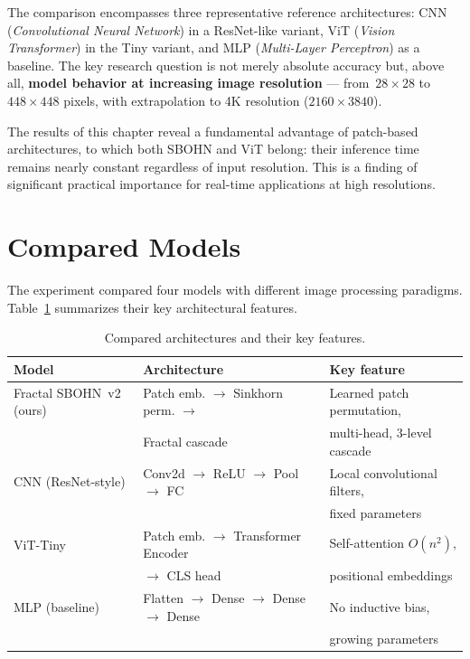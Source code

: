 \documentclass[11pt,a4paper]{report}
\begin{document}
The comparison encompasses three representative reference architectures: CNN (\emph{Convolutional Neural Network}) in a ResNet-like variant, ViT (\emph{Vision Transformer}) in the Tiny variant, and MLP (\emph{Multi-Layer Perceptron}) as a baseline. The key research question is not merely absolute accuracy but, above all, \textbf{model behavior at increasing image resolution} --- from~$28\times28$ to~$448\times448$ pixels, with extrapolation to 4K resolution ($2160\times3840$).

The results of this chapter reveal a fundamental advantage of patch-based architectures, to which both SBOHN and ViT belong: their inference time remains nearly constant regardless of input resolution. This is a finding of significant practical importance for real-time applications at high resolutions.



\section{Compared Models}

The experiment compared four models with different image processing paradigms. Table~\ref{tab:sota_architektures} summarizes their key architectural features.

\begin{table}[htbp]
\centering
\caption{Compared architectures and their key features.}
\label{tab:sota_architektures}
\begin{tabular}{|l|l|l|}
\hline
\textbf{Model} & \textbf{Architecture} & \textbf{Key feature} \\
\hline
Fractal SBOHN~v2 (ours) & Patch emb. $\to$ Sinkhorn perm. $\to$ & Learned patch permutation, \\
 & Fractal cascade & multi-head, 3-level cascade \\
\hline
CNN (ResNet-style) & Conv2d $\to$ ReLU $\to$ Pool $\to$ FC & Local convolutional filters, \\
 & & fixed parameters \\
\hline
ViT-Tiny & Patch emb. $\to$ Transformer Encoder & Self-attention $O(n^2)$, \\
 & $\to$ CLS head & positional embeddings \\
\hline
MLP (baseline) & Flatten $\to$ Dense $\to$ Dense $\to$ Dense & No inductive bias, \\
 & & growing parameters \\
\hline
\end{tabular}
\end{table}
\end{document}
